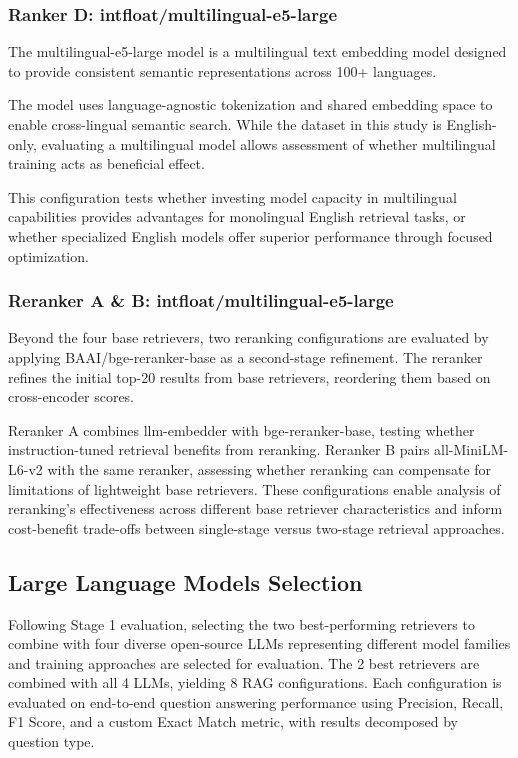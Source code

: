 \documentclass[10pt,twocolumn]{article}
\begin{document}
\subsubsection{Ranker D: intfloat/multilingual-e5-large}

The multilingual-e5-large model \cite{wangMultilingualE5Text2024} is a multilingual text embedding model designed to provide consistent semantic representations across 100+ languages.

The model uses language-agnostic tokenization and shared embedding space to enable cross-lingual semantic search. While the dataset in this study is English-only, evaluating a multilingual model allows assessment of whether multilingual training acts as beneficial effect.

This configuration tests whether investing model capacity in multilingual capabilities provides advantages for monolingual English retrieval tasks, or whether specialized English models offer superior performance through focused optimization.

\subsubsection{Reranker A \& B: intfloat/multilingual-e5-large}

Beyond the four base retrievers, two reranking configurations are evaluated by applying BAAI/bge-reranker-base as a second-stage refinement. The reranker refines the initial top-20 results from base retrievers, reordering them based on cross-encoder scores.

Reranker A combines llm-embedder with bge-reranker-base, testing whether instruction-tuned retrieval benefits from reranking. Reranker B pairs all-MiniLM-L6-v2 with the same reranker, assessing whether reranking can compensate for limitations of lightweight base retrievers. These configurations enable analysis of reranking's effectiveness across different base retriever characteristics and inform cost-benefit trade-offs between single-stage versus two-stage retrieval approaches.


\subsection{Large Language Models Selection}

Following Stage 1 evaluation, selecting the two best-performing retrievers to combine with four diverse open-source LLMs representing different model families and training approaches are selected for evaluation. The 2 best retrievers are combined with all 4 LLMs, yielding 8 RAG configurations. Each configuration is evaluated on end-to-end question answering performance using Precision, Recall, F1 Score, and a custom Exact Match metric, with results decomposed by question type.
\end{document}
